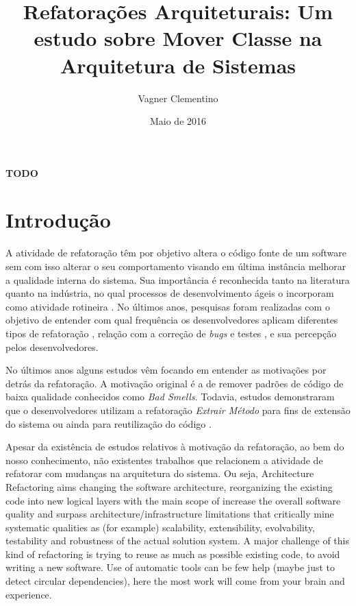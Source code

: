 \documentclass[12pt]{article}
\title{Refatorações Arquiteturais: Um estudo sobre Mover Classe na Arquitetura de Sistemas}
\author{Vagner Clementino\inst{1}}
\date{Maio de 2016}
\begin{document}
\maketitle


\begin{resumo}
 \textbf{TODO}
\end{resumo}


\section{Introdução}
\label{sec:intro}

A atividade de refatoração têm por objetivo altera o código fonte de um software sem com isso alterar o seu comportamento visando em última instância melhorar a qualidade interna do sistema\cite{1999:RID:311424,Opdyke:1992:ROF:169783}. Sua importância é reconhecida tanto na literatura quanto na indústria, no qual processos de desenvolvimento ágeis o incorporam como atividade rotineira \cite{Beck:2000:PEP:557458}. No últimos anos, pesquisas foram realizadas com o objetivo de entender com qual frequência os desenvolvedores aplicam diferentes tipos de refatoração \cite{Murphy-Hill:2009:WRW:1555001.1555044}, relação com a correção de \textit{bugs}\cite{Kim:2011:EIR:1985793.1985815} e testes \cite{Kim:2012:EII:2473496.2473590}, e sua percepção pelos desenvolvedores\cite{Kim:2012:FSR:2393596.2393655}.


No últimos anos alguns estudos vêm focando em entender as motivações por detrás da refatoração. A motivação original é a de remover padrões de código de baixa qualidade conhecidos como \textit{Bad Smells}\cite{1999:RID:311424}. Todavia, estudos demonstraram que o desenvolvedores utilizam a refatoração \textit{Extrair Método} para fins de extensão do sistema \cite{Tsantalis2013} ou ainda para reutilização do código \cite{Danilo}. 

Apesar da existência de estudos relativos à motivação da refatoração, ao bem do nosso conhecimento, não existentes trabalhos que relacionem a atividade de refatorar com mudanças na arquitetura do sistema. Ou seja, Architecture Refactoring aims changing the software architecture, reorganizing the existing code into new logical layers with the main scope of increase the overall software quality and surpass architecture/infrastructure limitations that critically mine systematic qualities as (for example) scalability, extensibility, evolvability, testability and robustness of the actual solution system. A major challenge of this kind of refactoring is trying to reuse as much as possible existing code, to avoid writing a new software. Use of automatic tools can be few help (maybe just to detect circular dependencies), here the most work will come from your brain and experience.



\end{document}
